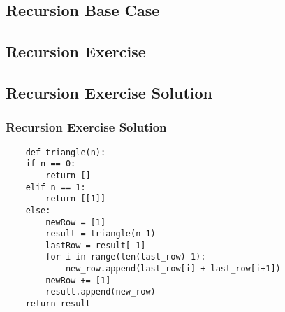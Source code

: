 \documentclass{beamer}
\begin{document}
\subsection{Recursion Base Case}

\subsection{Recursion Exercise}


\subsection{Recursion Exercise Solution}
\begin{frame}[fragile]
\frametitle{Recursion Exercise Solution}
\begin{lstlisting}
    def triangle(n):
    if n == 0:
        return []
    elif n == 1:
        return [[1]]
    else:
        newRow = [1]
        result = triangle(n-1)
        lastRow = result[-1]
        for i in range(len(last_row)-1):
            new_row.append(last_row[i] + last_row[i+1])
        newRow += [1]
        result.append(new_row)
    return result
  \end{lstlisting}
\end{frame}
\end{document}
